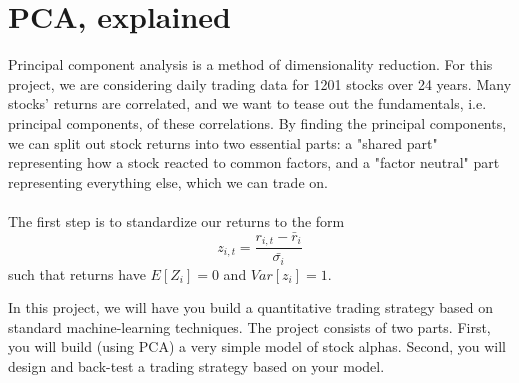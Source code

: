 \documentclass[12pt,letterpaper]{article}
\begin{document}
\section{PCA, explained}
Principal component analysis is a method of dimensionality reduction. For this project, we are considering daily trading data for 1201 stocks over 24 years. Many stocks' returns are correlated, and we want to tease out the fundamentals, i.e. principal components, of these correlations. By finding the principal components, we can split out stock returns into two essential parts: a "shared part" representing how a stock reacted to common factors, and a "factor neutral" part representing everything else, which we can trade on. 
\\
\\
The first step is to standardize our returns to the form 
$$z_{i,t}=\frac{r_{i,t}-\bar{r}_i}{\bar{\sigma_i}}$$
such that returns have $E[Z_i]=0$ and $Var[z_i]=1$.



\newpage
In this project, we will have you build a quantitative trading strategy based
on standard machine-learning techniques. The project consists of two parts.
First, you will build (using PCA) a very simple model of stock alphas.
Second, you will design and back-test a trading strategy based on your model.
\end{document}
